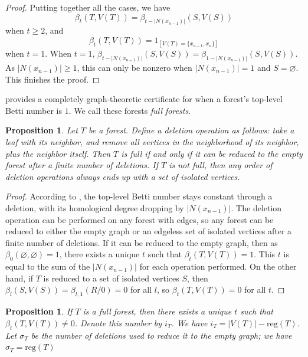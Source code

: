 \documentclass[dvipsnames,10pt]{article}
\newcommand{\reg}{\mathrm{reg}}
\newtheorem{proposition}[theorem]{Proposition}
\begin{document}
\begin{proof}
    Putting together all the cases, we have
    \begin{equation*}
        \beta_t(T,V(T)) = \beta_{t-|N(x_{n-1})|}(S,V(S))
    \end{equation*}
    when $t\geqslant 2$, and
    \begin{equation*}
        \beta_t(T,V(T)) = 1_{[V(T)=\{x_{n-1},x_n\}]}
    \end{equation*}
    when $t=1$.
    When $t=1$, $\beta_{t-|N(x_{n-1})|}(S,V(S))=\beta_{1-|N(x_{n-1})|}(S,V(S))$. As $|N(x_{n-1})|\geqslant 1$, this can only be nonzero when $|N(x_{n-1})|=1$ and $S=\varnothing$. This finishes the proof.
\end{proof}

 provides a completely graph-theoretic certificate for when a forest's top-level Betti number is $1$. We call these forests \emph{full forests}.

\begin{proposition} 
    Let $T$ be a forest. Define a deletion operation as follows: take a leaf with its neighbor, and remove all vertices in the neighborhood of its neighbor, plus the neighbor itself. Then $T$ is full if and only if it can be reduced to the empty forest after a finite number of deletions.
    If $T$ is not full, then any order of deletion operations always ends up with a set of isolated vertices.
\end{proposition}

\begin{proof}
    According to , the top-level Betti number stays constant through a deletion, with its homological degree dropping by $|N(x_{n-1})|$. The deletion operation can be performed on any forest with edges, so any forest can be reduced to either the empty graph or an edgeless set of isolated vertices after a finite number of deletions. If it can be reduced to the empty graph, then as $\beta_0(\varnothing,\varnothing)=1$, there exists a unique $t$ such that $\beta_t(T,V(T))=1$. This $t$ is equal to the sum of the $|N(x_{n-1})|$ for each operation performed. On the other hand, if $T$ is reduced to a set of isolated vertices $S$, then $\beta_l(S,V(S))=\beta_{l,\mathbf{1}}(R/0)=0$ for all $l$, so $\beta_t(T,V(T))=0$ for all $t$.
\end{proof}

\begin{proposition} 
    If $T$ is a full forest, then there exists a unique $t$ such that $\beta_t(T,V(T))\neq 0$. Denote this number by $i_T$. We have $i_T=|V(T)|-\reg(T)$. Let $\sigma_T$ be the number of deletions used to reduce it to the empty graph; we have $\sigma_T = \mathrm{reg}(T)$
\end{proposition}
\end{document}
